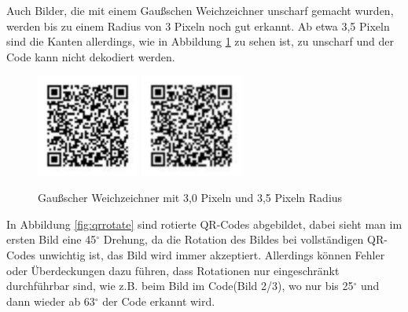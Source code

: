 Auch Bilder, die mit einem Gaußschen Weichzeichner unscharf gemacht wurden, werden bis zu einem Radius von 3 Pixeln noch gut erkannt. Ab etwa 3,5 Pixeln sind die Kanten allerdings, wie in Abbildung \ref*{fig:qrblur} zu sehen ist, zu unscharf und der Code kann nicht dekodiert werden.
\begin{figure}[H]
  \centering
  \includegraphics[width=0.3\textwidth]{img/QR/blurry_03_3.jpg}
  \includegraphics[width=0.3\textwidth]{img/QR/blurry_03_35f.jpg}
  \caption{Gaußscher Weichzeichner mit 3,0 Pixeln und 3,5 Pixeln Radius}
  \label{fig:qrblur}
\end{figure}

In Abbildung \ref*{fig:qrrotate} sind rotierte QR-Codes abgebildet, dabei sieht man im ersten Bild eine 45$ ^\circ $ Drehung, da die Rotation des Bildes bei vollständigen QR-Codes unwichtig ist, das Bild wird immer akzeptiert. Allerdings können Fehler oder Überdeckungen dazu führen, dass Rotationen nur eingeschränkt durchführbar sind, wie z.B. beim Bild im Code(Bild 2/3), wo nur bis 25$^\circ$ und dann wieder ab 63$^\circ$ der Code erkannt wird.

